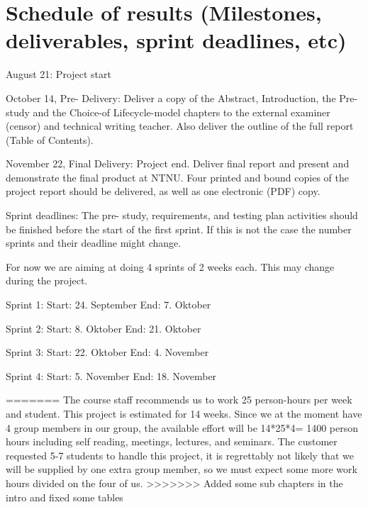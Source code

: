 \section{Schedule of results (Milestones, deliverables, sprint deadlines, etc)}
August 21: Project start

October 14, Pre- Delivery: Deliver a copy of the Abstract, Introduction, the Pre-study and the Choice-of Lifecycle-model chapters to the external examiner (censor) and technical writing teacher. Also deliver the outline of the full report (Table of  Contents).

November 22, Final Delivery: Project end. Deliver final report and present and demonstrate the final product at NTNU. Four printed and bound copies of  the project report should be delivered, as well as one electronic (PDF) copy.

Sprint deadlines:
The pre- study, requirements, and testing plan activities should be finished before the start of the first sprint. If this is not the case the number sprints and their deadline might change.

For now we are aiming at doing 4 sprints of 2 weeks each. This may change during the project.

Sprint 1: 
Start: 24. September
End: 7. Oktober

Sprint 2:
Start: 8. Oktober
End: 21. Oktober

Sprint 3:
Start: 22. Oktober
End: 4. November

Sprint 4:
Start: 5. November
End: 18. November

=======
The course staff recommends us to work 25 person-hours per week and student. This project is estimated for 14 weeks. Since we at the moment have 4 group members in our group, the available effort will be 14*25*4= 1400 person hours including self reading, meetings, lectures, and seminars. The customer requested 5-7 students to handle this project, it is regrettably not likely that we will be supplied by one extra group member, so we must expect some more work hours divided on the four of us.
>>>>>>> Added some sub chapters in the intro and fixed some tables
